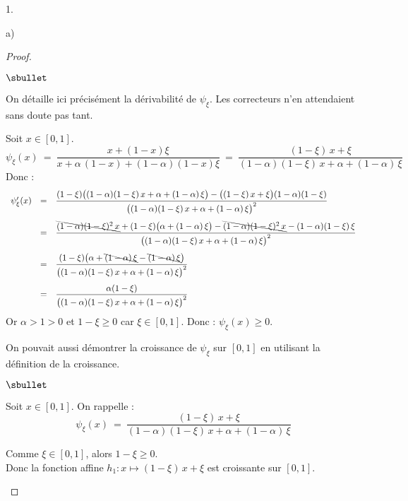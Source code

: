 \begin{noliste}{1.}
\begin{noliste}{a)}
\begin{proof}
\begin{noliste}{$\sbullet$}
	\begin{remark}
	  On détaille ici précisément la dérivabilité de $\psi_\xi$.
	  Les correcteurs n'en attendaient sans doute pas tant.
	\end{remark}

	
	\item Soit $x \in [0,1]$.
	\[
	  \psi_\xi(x) \ = \ 
	  \dfrac{x+ (1-x) \xi}{x + \alpha \, (1-x) + 
	  (1- \alpha)(1-x)\xi}
	  \ = \
	  \dfrac{(1-\xi) \, x + \xi}
	  {(1-\alpha)(1-\xi) \, x + \alpha + (1-\alpha) \, \xi}
	\]
	Donc :
	\[
	  \begin{array}{rcl}
	    \psi_\xi'(x) &=& 
	    \dfrac{(1-\xi)\big((1-\alpha)(1-\xi) \, x + \alpha 
	    + (1-\alpha) \, \xi\big) - \big((1-\xi) \, x + \xi\big)
	    (1-\alpha)(1-\xi)}
	    {\big((1-\alpha)(1-\xi) \, x + \alpha + (1-\alpha) \,
	    \xi\big)^2}
	    \\[.6cm]
	    &=& \dfrac{\bcancel{(1-\alpha)(1-\xi)^2 \, x} + 
	    (1-\xi)\big(\alpha + (1-\alpha) \, \xi\big) - 
	    \bcancel{(1-\alpha)(1-\xi)^2 \, x} - (1-\alpha)(1-\xi)
	    \, \xi}
	    {\big((1-\alpha)(1-\xi) \, x + \alpha + (1-\alpha) \,
	    \xi\big)^2}
	    \\[.6cm]
	    &=& \dfrac{(1-\xi)\big(\alpha + \bcancel{(1-\alpha) \, \xi}
	    - \bcancel{(1-\alpha) \, \xi}\big)}
	    {\big((1-\alpha)(1-\xi) \, x + \alpha + (1-\alpha) \,
	    \xi\big)^2}
	    \\[.6cm]
	    &=& \dfrac{\alpha (1-\xi)}
	    {\big((1-\alpha)(1-\xi) \, x + \alpha + (1-\alpha) \,
	    \xi\big)^2}
	  \end{array}
	\]
	Or $\alpha >1>0$ et $1-\xi \geq 0$ car $\xi \in [0,1]$. Donc :
	$\psi_\xi(x) \geq 0$.
      \end{noliste}
      
      \begin{remark}
        On pouvait aussi démontrer la croissance de $\psi_\xi$ sur 
        $[0,1]$ en utilisant la définition de la croissance.
        \begin{noliste}{$\sbullet$}
	  \item Soit $x \in [0,1]$. On rappelle :
	  \[
	    \psi_\xi(x) \ = \ \dfrac{(1-\xi) \, x + \xi}
	    {(1-\alpha)(1-\xi) \, x + \alpha + (1-\alpha) \, \xi}
	  \]
	  
	  \item Comme $\xi \in [0,1]$, alors $1-\xi \geq 0$.\\
	  Donc la fonction affine $h_1 : x \mapsto (1-\xi) \, x + \xi$ 
	  est croissante sur $[0,1]$.
	  

\end{noliste}
\end{remark}
\end{proof}
\end{noliste}
\end{noliste}
